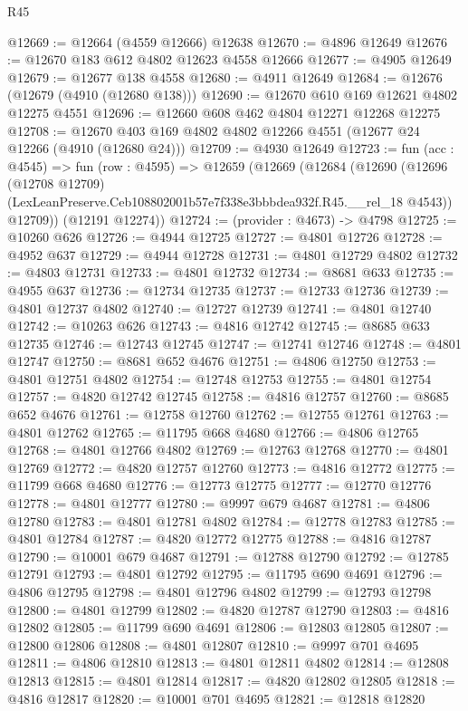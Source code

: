 \begin{lexlean}{R45}
\begin{coremodule}
@12669 := @12664 (@4559 @12666) @12638
@12670 := @4896 @12649
@12676 := @12670 @183 @612 @4802 @12623 @4558 @12666
@12677 := @4905 @12649
@12679 := @12677 @138 @4558
@12680 := @4911 @12649
@12684 := @12676 (@12679 (@4910 (@12680 @138)))
@12690 := @12670 @610 @169 @12621 @4802 @12275 @4551
@12696 := @12660 @608 @462 @4804 @12271 @12268 @12275
@12708 := @12670 @403 @169 @4802 @4802 @12266 @4551 (@12677 @24 @12266 (@4910 (@12680 @24)))
@12709 := @4930 @12649
@12723 := fun (acc : @4545) =>
  fun (row : @4595) =>
  @12659
    (@12669
      (@12684
        (@12690
          (@12696
            (@12708 @12709)
            (LexLeanPreserve.Ceb108802001b57e7f338e3bbbdea932f.R45.__rel_18 @4543))
          @12709))
      (@12191 @12274))
@12724 := (provider : @4673) -> @4798
@12725 := @10260 @626
@12726 := @4944 @12725
@12727 := @4801 @12726
@12728 := @4952 @637
@12729 := @4944 @12728
@12731 := @4801 @12729 @4802
@12732 := @4803 @12731
@12733 := @4801 @12732
@12734 := @8681 @633
@12735 := @4955 @637
@12736 := @12734 @12735
@12737 := @12733 @12736
@12739 := @4801 @12737 @4802
@12740 := @12727 @12739
@12741 := @4801 @12740
@12742 := @10263 @626
@12743 := @4816 @12742
@12745 := @8685 @633 @12735
@12746 := @12743 @12745
@12747 := @12741 @12746
@12748 := @4801 @12747
@12750 := @8681 @652 @4676
@12751 := @4806 @12750
@12753 := @4801 @12751 @4802
@12754 := @12748 @12753
@12755 := @4801 @12754
@12757 := @4820 @12742 @12745
@12758 := @4816 @12757
@12760 := @8685 @652 @4676
@12761 := @12758 @12760
@12762 := @12755 @12761
@12763 := @4801 @12762
@12765 := @11795 @668 @4680
@12766 := @4806 @12765
@12768 := @4801 @12766 @4802
@12769 := @12763 @12768
@12770 := @4801 @12769
@12772 := @4820 @12757 @12760
@12773 := @4816 @12772
@12775 := @11799 @668 @4680
@12776 := @12773 @12775
@12777 := @12770 @12776
@12778 := @4801 @12777
@12780 := @9997 @679 @4687
@12781 := @4806 @12780
@12783 := @4801 @12781 @4802
@12784 := @12778 @12783
@12785 := @4801 @12784
@12787 := @4820 @12772 @12775
@12788 := @4816 @12787
@12790 := @10001 @679 @4687
@12791 := @12788 @12790
@12792 := @12785 @12791
@12793 := @4801 @12792
@12795 := @11795 @690 @4691
@12796 := @4806 @12795
@12798 := @4801 @12796 @4802
@12799 := @12793 @12798
@12800 := @4801 @12799
@12802 := @4820 @12787 @12790
@12803 := @4816 @12802
@12805 := @11799 @690 @4691
@12806 := @12803 @12805
@12807 := @12800 @12806
@12808 := @4801 @12807
@12810 := @9997 @701 @4695
@12811 := @4806 @12810
@12813 := @4801 @12811 @4802
@12814 := @12808 @12813
@12815 := @4801 @12814
@12817 := @4820 @12802 @12805
@12818 := @4816 @12817
@12820 := @10001 @701 @4695
@12821 := @12818 @12820

\end{coremodule}
\end{lexlean}
